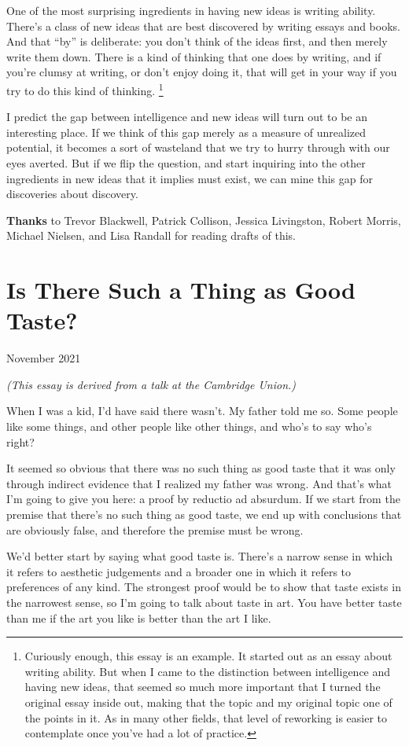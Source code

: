 \documentclass[12pt]{book}
\begin{document}
One of the most surprising ingredients in having new ideas is writing
ability. There's a class of new ideas that are best discovered by
writing essays and books. And that ``by'' is deliberate: you don't think
of the ideas first, and then merely write them down. There is a kind of
thinking that one does by writing, and if you're clumsy at writing, or
don't enjoy doing it, that will get in your way if you try to do this
kind of thinking. \footnote{Curiously enough, this essay is an example. It started out as an
essay about writing ability. But when I came to the distinction between
intelligence and having new ideas, that seemed so much more important
that I turned the original essay inside out, making that the topic and
my original topic one of the points in it. As in many other fields, that
level of reworking is easier to contemplate once you've had a lot of
practice.}

I predict the gap between intelligence and new ideas will turn out to be
an interesting place. If we think of this gap merely as a measure of
unrealized potential, it becomes a sort of wasteland that we try to
hurry through with our eyes averted. But if we flip the question, and
start inquiring into the other ingredients in new ideas that it implies
must exist, we can mine this gap for discoveries about discovery.


\textbf{Thanks} to Trevor Blackwell, Patrick Collison, Jessica
Livingston, Robert Morris, Michael Nielsen, and Lisa Randall for reading
drafts of this.
\chapter{Is There Such a Thing as Good Taste?}

November 2021

\emph{(This essay is derived from a talk at the Cambridge Union.)}

When I was a kid, I'd have said there wasn't. My father told me so. Some
people like some things, and other people like other things, and who's
to say who's right?

It seemed so obvious that there was no such thing as good taste that it
was only through indirect evidence that I realized my father was wrong.
And that's what I'm going to give you here: a proof by reductio ad
absurdum. If we start from the premise that there's no such thing as
good taste, we end up with conclusions that are obviously false, and
therefore the premise must be wrong.

We'd better start by saying what good taste is. There's a narrow sense
in which it refers to aesthetic judgements and a broader one in which it
refers to preferences of any kind. The strongest proof would be to show
that taste exists in the narrowest sense, so I'm going to talk about
taste in art. You have better taste than me if the art you like is
better than the art I like.
\end{document}
